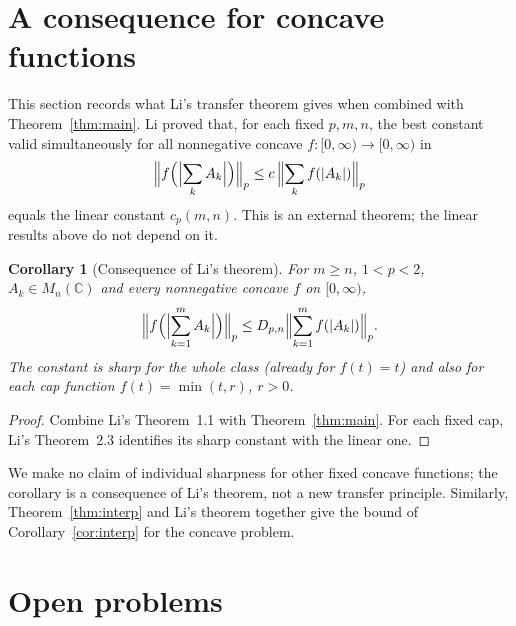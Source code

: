 \documentclass[11pt,a4paper]{article}
\numberwithin{equation}{section}
\newtheorem{corollary}[theorem]{Corollary}
\theoremstyle{definition}
\theoremstyle{remark}
\newcommand{\C}{\mathbb C}
\begin{document}
\section{A consequence for concave functions}\label{sec:concave}

This section records what Li's transfer theorem gives when combined with
Theorem~\ref{thm:main}. Li \cite[Theorem 1.1]{Li} proved that, for each
fixed \(p,m,n\), the best constant valid simultaneously for all
nonnegative concave \(f:[0,\infty)\to[0,\infty)\) in
\[
 \Bigl\|f\Bigl(\Bigl|\sum_kA_k\Bigr|\Bigr)\Bigr\|_p
 \le c\,\Bigl\|\sum_kf(|A_k|)\Bigr\|_p
\]
equals the linear constant \(c_p(m,n)\). This is an external theorem; the
linear results above do not depend on it.

\begin{corollary}[Consequence of Li's theorem]\label{cor:concave}
For \(m\ge n\), \(1<p<2\), \(A_k\in M_n(\C)\) and every nonnegative concave
\(f\) on \([0,\infty)\),
\begin{equation}\label{eq:concave}
 \Bigl\|f\Bigl(\Bigl|\sum_{k=1}^mA_k\Bigr|\Bigr)\Bigr\|_p
 \le D_{p,n}\Bigl\|\sum_{k=1}^mf(|A_k|)\Bigr\|_p .
\end{equation}
The constant is sharp for the whole class (already for \(f(t)=t\)) and
also for each cap function \(f(t)=\min(t,r)\), \(r>0\).
\end{corollary}

\begin{proof}
Combine Li's Theorem~1.1 with Theorem~\ref{thm:main}. For each fixed cap,
Li's Theorem~2.3 identifies its sharp constant with the linear one.
\end{proof}

We make no claim of individual sharpness for other fixed concave
functions; the corollary is a consequence of Li's theorem, not a new
transfer principle. Similarly, Theorem~\ref{thm:interp} and Li's theorem
together give the bound of Corollary~\ref{cor:interp} for the concave
problem.

\section{Open problems}\label{sec:open}
\end{document}
